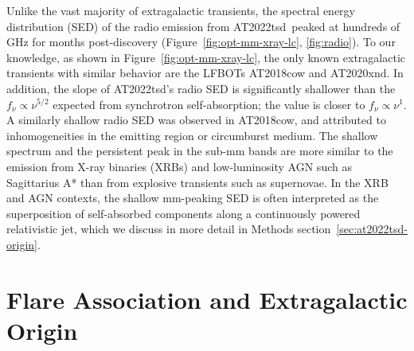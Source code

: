 \documentclass{nature_plusfigure}
\newcommand{\at}{AT2022tsd}
\begin{document}
\begin{methods}
Unlike the vast majority of extragalactic transients, the spectral energy distribution (SED) of the radio emission from \at\ peaked at hundreds of GHz for months post-discovery (Figure~\ref{fig:opt-mm-xray-lc}, \ref{fig:radio}). To our knowledge, as shown in Figure~\ref{fig:opt-mm-xray-lc}, the only known extragalactic transients with similar behavior are the LFBOTs AT2018cow\cite{Ho2019} and AT2020xnd\cite{Ho2022_AT2020xnd,Bright2022}.
In addition, the slope of \at's radio SED is significantly shallower than the $f_\nu \propto \nu^{5/2}$ expected from synchrotron self-absorption\cite{Rybicki1986}; the value is closer to $f_\nu \propto \nu^{1}$. A similarly shallow radio SED was observed in AT2018cow\cite{Nayana2021}, and attributed to inhomogeneities in the emitting region or circumburst medium\cite{Nayana2021}.
The shallow spectrum and the persistent peak in the sub-mm bands are more similar to the emission from X-ray binaries (XRBs\cite{Fender2001,Tetarenko2021,Fender2023}) and low-luminosity AGN such as Sagittarius A*\cite{Falcke1998} than from explosive transients such as supernovae\cite{Chevalier1998}. 
In the XRB and AGN contexts, the shallow mm-peaking SED is often interpreted as the superposition of self-absorbed components along a continuously powered relativistic jet\cite{Blandford1979}, which we discuss in more detail in Methods section~\ref{sec:at2022tsd-origin}.

\section{Flare Association and Extragalactic Origin}
\label{sec:flare-association}


\end{methods}
\end{document}
